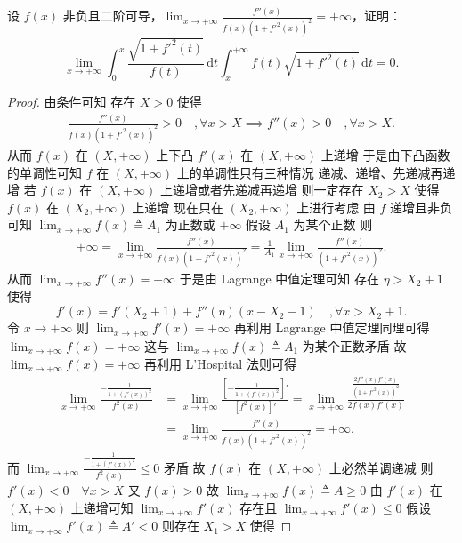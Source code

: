 \documentclass[../../main.tex]{subfiles}%
\begin{document}
\vspace{0.5cm}

\begin{example}
设 \( f(x) \) 非负且二阶可导，\( \lim_{x \to +\infty} \frac{f''(x)}{f(x)(1 + f'^2(x))^2} = +\infty \)，证明：
\[
\lim_{x \to +\infty} \int_0^x \frac{\sqrt{1 + f'^2(t)}}{f(t)} \, \mathrm{d}t \int_x^{+\infty} f(t) \sqrt{1 + f'^2(t)} \, \mathrm{d}t = 0.
\] 
\end{example}
\begin{proof}
由条件可知 存在 \( X > 0 \) 使得
\begin{align*}
\frac{f''(x)}{f(x)(1 + f'^2(x))^2} > 0 \quad ,\forall x > X \implies f''(x) > 0 \quad ,\forall x > X.
\end{align*}
从而 \( f(x) \) 在 \( (X, +\infty) \) 上下凸 \( f'(x) \) 在 \( (X, +\infty) \) 上递增 于是由下凸函数的单调性可知 \( f \) 在 \( (X, +\infty) \) 上的单调性只有三种情况 递减、递增、先递减再递增 若 \( f(x) \) 在 \( (X, +\infty) \) 上递增或者先递减再递增 则一定存在 \( X_2 > X \) 使得 \( f(x) \) 在 \( (X_2, +\infty) \) 上递增 现在只在 \( (X_2, +\infty) \) 上进行考虑 由 \( f \) 递增且非负可知 \( \lim_{x \to +\infty} f(x) \triangleq A_1 \) 为正数或 \( +\infty \) 假设 \( A_1 \) 为某个正数 则
\begin{align*}
+\infty = \lim_{x \to +\infty} \frac{f''(x)}{f(x)(1 + f'^2(x))^2} = \frac{1}{A_1} \lim_{x \to +\infty} \frac{f''(x)}{(1 + f'^2(x))^2}.
\end{align*}
从而 \( \lim_{x \to +\infty} f''(x) = +\infty \) 于是由 Lagrange 中值定理可知 存在 \( \eta > X_2 + 1 \) 使得
\[
f'(x) = f'(X_2 + 1) + f''(\eta)(x - X_2 - 1) \quad, \forall x > X_2 + 1.
\]
令 \( x \to +\infty \) 则 \( \lim_{x \to +\infty} f'(x) = +\infty \) 再利用 Lagrange 中值定理同理可得 \( \lim_{x \to +\infty} f(x) = +\infty \) 这与 \( \lim_{x \to +\infty} f(x) \triangleq A_1 \) 为某个正数矛盾 故 \( \lim_{x \to +\infty} f(x) = +\infty \) 再利用 L’Hospital 法则可得
\begin{align*}
\lim_{x \to +\infty} \frac{-\frac{1}{1 + (f'(x))^2}}{f^2(x)} &= \lim_{x \to +\infty} \frac{\left[ -\frac{1}{1 + (f'(x))^2} \right]'}{\left[ f^2(x) \right]'} = \lim_{x \to +\infty} \frac{\frac{2f''(x)f'(x)}{(1 + f'^2(x))^2}}{2f(x)f'(x)} \\
&= \lim_{x \to +\infty} \frac{f''(x)}{f(x)(1 + f'^2(x))^2} = +\infty.
\end{align*}
而 \( \lim_{x \to +\infty} \frac{-\frac{1}{1 + (f'(x))^2}}{f^2(x)} \leqslant 0 \) 矛盾 故 \( f(x) \) 在 \( (X, +\infty) \) 上必然单调递减 则 \( f'(x) < 0 \quad \forall x > X \) 又 \( f(x) > 0 \) 故 \( \lim_{x \to +\infty} f(x) \triangleq A \geqslant 0 \) 由 \( f'(x) \) 在 \( (X, +\infty) \) 上递增可知 \( \lim_{x \to +\infty} f'(x) \) 存在且 \( \lim_{x \to +\infty} f'(x) \leqslant 0 \) 假设 \( \lim_{x \to +\infty} f'(x) \triangleq A' < 0 \) 则存在 \( X_1 > X \) 使得

\end{proof}
\end{document}
